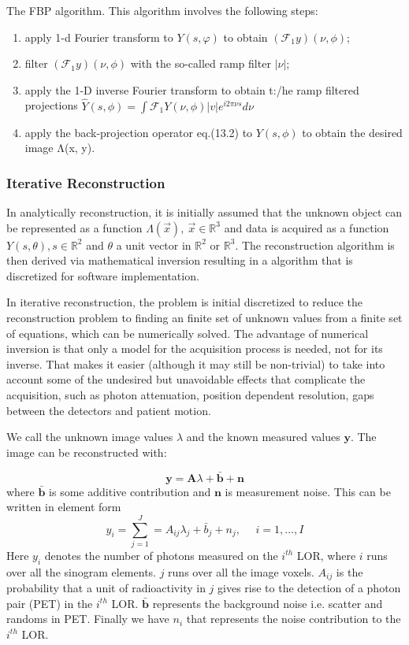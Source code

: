 \documentclass{article}
\begin{document}
The FBP algorithm. This algorithm involves the following steps:

\begin{enumerate}
\item apply 1-d Fourier transform to $Y(s, φ)$ to obtain $(\mathscr{F}_1y)(ν, \phi)$;
\item filter $(\mathscr{F}_1y)(ν, \phi)$ with the so-called ramp filter $|ν|$;
\item apply the 1-D inverse Fourier transform to obtain t:/he ramp filtered projections $\hat{Y}(s,\phi) = \int \mathscr{F}_1 Y(\nu, \phi) |v| e^{i2\pi\nu s}d\nu$
\item apply the back-projection operator eq.(13.2) to $Y(s,\phi)$ to obtain the desired image Λ(x, y).
\end{enumerate}


\subsubsection{Iterative Reconstruction}
In analytically reconstruction, it is initially assumed that the unknown object can be represented as a function $\Lambda(\vec{x}),\ \vec{x}\in \mathbb{R}^3$ and data is acquired as a function $Y(s,\theta), s\in\mathbb{R}^2$ and $\theta$ a unit vector in $\mathbb{R}^2$ or $\mathbb{R}^3$. The reconstruction algorithm is then derived via mathematical inversion resulting in a algorithm that is discretized for software implementation.

In iterative reconstruction, the problem is initial discretized to reduce the reconstruction problem to finding an finite set of unknown values from a finite set of equations, which can be numerically solved. The advantage of numerical inversion is that only a model for the acquisition process is needed, not for its inverse. That makes it easier (although it may still be non-trivial) to take into account some of the undesired but unavoidable effects that complicate the acquisition, such as photon attenuation, position dependent resolution, gaps between the detectors and patient motion.

We call the unknown image values $\lambda$ and the known measured values $\textbf{y}$. The image can be reconstructed with:

\begin{equation}
\textbf{y} = \textbf{A} \lambda +\bar{\textbf{b}} +\textbf{n}
\end{equation}
where $\bar{\textbf{b}}$ is some additive contribution and $\textbf{n}$ is measurement noise. This can be written in element form
\begin{equation}
y_i = \sum_{j=1}^J = A_{ij}\lambda_{j} +\bar{b}_j + n_j, \ \ \ \ \ \ i=1,...,I 
\end{equation}
Here $y_i$ denotes the number of photons measured on the $i^{th}$ LOR, where $i$ runs over all the sinogram elements. $j$ runs over all the image voxels. $A_{ij}$ is the probability that a unit of radioactivity in $j$ gives rise to the detection of a photon pair (PET) in the $i^{th}$ LOR. $\bar{\textbf{b}}$ represents the background noise i.e. scatter and randoms in PET. Finally we have $n_i$ that represents the noise contribution to the $i^{th}$ LOR. 
\end{document}

